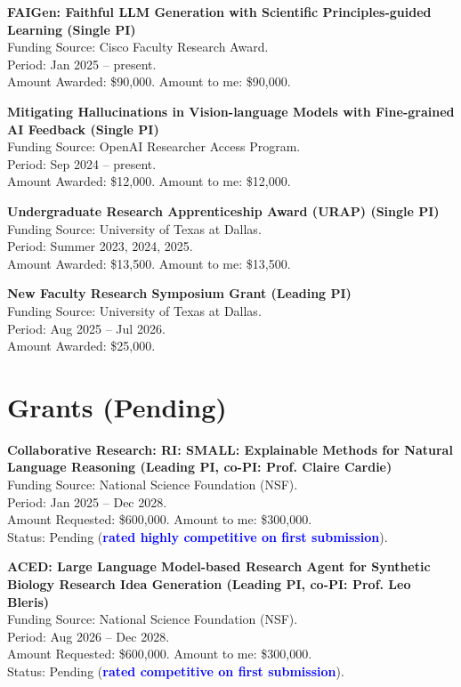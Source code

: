 \noindent \textbf{FAIGen: Faithful LLM Generation with Scientific Principles-guided Learning (Single PI)} \\
\indent Funding Source: Cisco Faculty Research Award. \\
\indent Period: Jan 2025 -- present. \\
\indent Amount Awarded: \$90,000. Amount to me: \$90,000.

\noindent \textbf{Mitigating Hallucinations in Vision-language Models with Fine-grained AI Feedback (Single PI)} \\
\indent Funding Source: OpenAI Researcher Access Program. \\
\indent Period: Sep 2024 -- present. \\
\indent Amount Awarded: \$12,000. Amount to me: \$12,000.

\noindent \textbf{Undergraduate Research Apprenticeship Award (URAP) (Single PI)} \\
\indent Funding Source: University of Texas at Dallas. \\
\indent Period: Summer 2023, 2024, 2025. \\
\indent Amount Awarded: \$13,500. Amount to me: \$13,500.

\noindent \textbf{New Faculty Research Symposium Grant (Leading PI)} \\
\indent Funding Source: University of Texas at Dallas. \\
\indent Period: Aug 2025 -- Jul 2026. \\
\indent Amount Awarded: \$25,000. \\


\section{Grants (Pending)}

\noindent \textbf{Collaborative Research: RI: SMALL: Explainable Methods for Natural Language Reasoning (Leading PI, co-PI: Prof. Claire Cardie)} \\
\indent Funding Source: National Science Foundation (NSF). \\
\indent Period: Jan 2025 -- Dec 2028. \\
\indent Amount Requested: \$600,000. Amount to me: \$300,000. \\
\indent Status: Pending (\textbf{\textcolor{blue}{rated highly competitive on first submission}}).

\noindent \textbf{ACED: Large Language Model-based Research Agent for Synthetic Biology Research Idea Generation (Leading PI, co-PI: Prof. Leo Bleris)} \\
\indent Funding Source: National Science Foundation (NSF). \\
\indent Period: Aug 2026 -- Dec 2028. \\
\indent Amount Requested: \$600,000. Amount to me: \$300,000. \\
\indent Status: Pending (\textbf{\textcolor{blue}{rated competitive on first submission}}).


